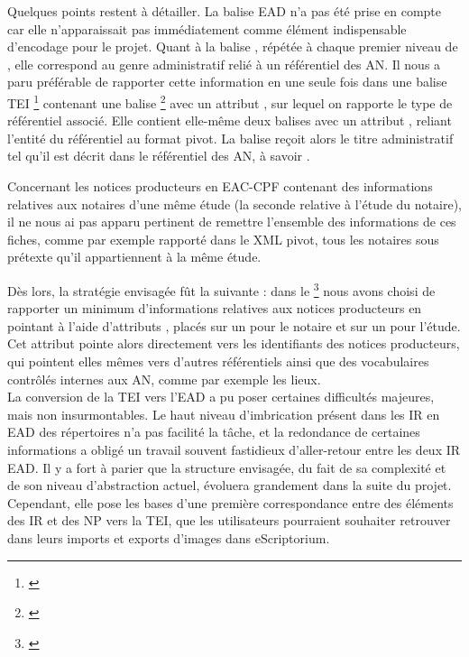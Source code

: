 Quelques points restent à détailler. La balise EAD  n'a pas été prise en compte car elle n'apparaissait pas immédiatement comme élément indispensable d'encodage pour le projet. Quant à la balise , répétée à chaque premier niveau de , elle correspond au genre administratif relié à un référentiel des AN. Il nous a paru préférable de rapporter cette information en une seule fois dans une balise TEI \footnote{\cite{tei_tei_nodate-19}} contenant une balise \footnote{\cite{tei_tei_nodate-18}} avec un attribut , sur lequel on rapporte le type de référentiel associé. Elle contient elle-même deux balises  avec un attribut , reliant l'entité du référentiel au format pivot. La balise reçoit alors le titre administratif tel qu'il est décrit dans le référentiel des AN, à savoir .

Concernant les notices producteurs en EAC-CPF contenant des informations relatives aux notaires d'une même étude (la seconde relative à l'étude du notaire), il ne nous ai pas apparu pertinent de remettre l'ensemble des informations de ces fiches, comme par exemple rapporté dans le XML pivot, tous les notaires sous prétexte qu'il appartiennent à la même étude. 

Dès lors, la stratégie envisagée fût la suivante : dans le \footnote{\cite{tei_tei_nodate-17}} nous avons choisi de rapporter un minimum d'informations relatives aux notices producteurs en pointant à l'aide d'attributs , placés sur un  pour le notaire et sur un  pour l'étude. Cet attribut pointe alors directement vers les identifiants des notices producteurs, qui pointent elles mêmes vers d'autres référentiels ainsi que des vocabulaires contrôlés internes aux AN, comme par exemple les lieux.\\

La conversion de la TEI vers l'EAD a pu poser certaines difficultés majeures, mais non insurmontables. Le haut niveau d'imbrication présent dans les IR en EAD des répertoires n'a pas facilité la tâche, et la redondance de certaines informations a obligé un travail souvent fastidieux d'aller-retour entre les deux IR EAD. Il y a fort à parier que la structure envisagée, du fait de sa complexité et de son niveau d'abstraction actuel, évoluera grandement dans la suite du projet. Cependant, elle pose les bases d'une première correspondance entre des éléments des IR et des NP vers la TEI, que les utilisateurs pourraient souhaiter retrouver dans leurs imports et exports d'images dans eScriptorium.


